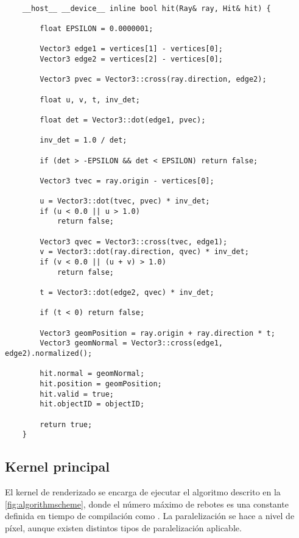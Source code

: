 \begin{minipage}[c]{0.95\textwidth}
\begin{lstlisting}[label={cod:triintersection}, caption={Adaptación de código Fast Minimum Storage Ray/Triangle Intersection\cite{moller1997fast} a Eleven Renderer}]
	
	__host__ __device__ inline bool hit(Ray& ray, Hit& hit) {

		float EPSILON = 0.0000001;

        Vector3 edge1 = vertices[1] - vertices[0];
        Vector3 edge2 = vertices[2] - vertices[0];

        Vector3 pvec = Vector3::cross(ray.direction, edge2);

        float u, v, t, inv_det;

        float det = Vector3::dot(edge1, pvec);

        inv_det = 1.0 / det;

        if (det > -EPSILON && det < EPSILON) return false;

        Vector3 tvec = ray.origin - vertices[0];

        u = Vector3::dot(tvec, pvec) * inv_det;
        if (u < 0.0 || u > 1.0)
            return false;

        Vector3 qvec = Vector3::cross(tvec, edge1);
        v = Vector3::dot(ray.direction, qvec) * inv_det;
        if (v < 0.0 || (u + v) > 1.0)
            return false;

        t = Vector3::dot(edge2, qvec) * inv_det;

        if (t < 0) return false;

        Vector3 geomPosition = ray.origin + ray.direction * t;
		Vector3 geomNormal = Vector3::cross(edge1, edge2).normalized();
		
		hit.normal = geomNormal;
		hit.position = geomPosition;
		hit.valid = true;
		hit.objectID = objectID;

        return true;
	}

\end{lstlisting}
\end{minipage}

\subsection{Kernel principal}
	
El kernel de renderizado  se encarga de ejecutar el algoritmo descrito en la \autoref{fig:algorithmscheme}, donde el número máximo de rebotes es una constante definida en tiempo de compilación como . La paralelización se hace a nivel de píxel, aunque existen distintos tipos de paralelización aplicable.

